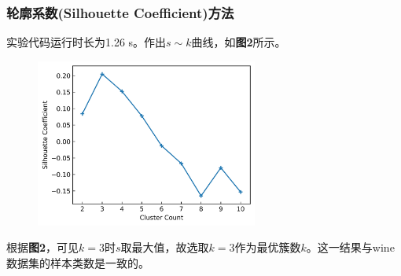 \documentclass[12pt]{article}
\begin{document}
\subsubsection{轮廓系数(Silhouette Coefficient)方法}
实验代码运行时长为1.26 s。作出$s\sim k$曲线，如\textbf{图2}所示。\par 
\begin{figure}[h]
	\centering
	\includegraphics[width=0.65\textwidth]{2.jpg}
\end{figure}
\par 
根据\textbf{图2}，可见$k=3$时$s$取最大值，故选取$k=3$作为最优簇数$k$。这一结果与wine数据集的样本类数是一致的。
\end{document}
